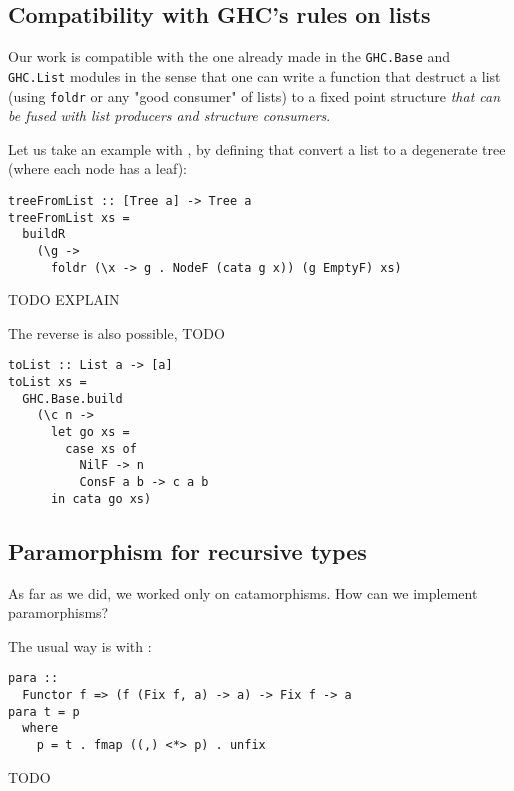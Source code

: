 \subsection{Compatibility with GHC's rules on lists}
Our work is compatible with the one already made in the \verb|GHC.Base| and \verb|GHC.List| modules in the sense that one can write a function that destruct a list (using \verb|foldr| or any "good consumer" of lists) to a fixed point structure \emph{that can be fused with list producers and structure consumers}.

Let us take an example with , by defining  that convert a list to a degenerate tree (where each node has a leaf):
\begin{verbatim}
treeFromList :: [Tree a] -> Tree a
treeFromList xs =
  buildR
    (\g ->
      foldr (\x -> g . NodeF (cata g x)) (g EmptyF) xs)
\end{verbatim}

TODO EXPLAIN

The reverse is also possible, TODO
\begin{verbatim}
toList :: List a -> [a]
toList xs =
  GHC.Base.build
    (\c n ->
      let go xs =
        case xs of
          NilF -> n
          ConsF a b -> c a b
      in cata go xs)
\end{verbatim}

\subsection{Paramorphism for recursive types}
\label{sec:para-rec}
As far as we did, we worked only on catamorphisms. How can we implement paramorphisms?

The usual way is with :
\begin{verbatim}
para ::
  Functor f => (f (Fix f, a) -> a) -> Fix f -> a
para t = p
  where
    p = t . fmap ((,) <*> p) . unfix
\end{verbatim}

TODO
